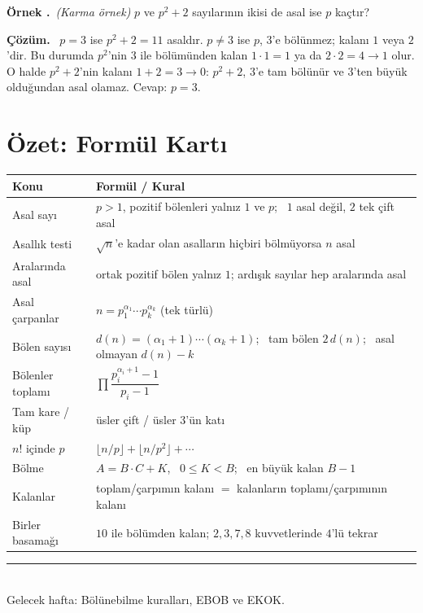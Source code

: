 \documentclass[11pt,a4paper]{article}
\newcounter{ornek}
\newenvironment{ornek}{\refstepcounter{ornek}\par\medskip\noindent\textbf{\color{anamavi}Örnek \theornek.}\ }{\par}
\newenvironment{cozum}{\begin{tcolorbox}[colback=cozumyesil!6,colframe=cozumyesil,boxrule=0.5pt,left=4pt,right=4pt,top=2pt,bottom=2pt,breakable]\textbf{\color{cozumyesil}Çözüm.}\ }{\end{tcolorbox}}
\newcounter{alis}
\begin{document}
\begin{ornek}\textit{(Karma örnek)}
\(p\) ve \(p^2+2\) sayılarının ikisi de asal ise \(p\) kaçtır?
\end{ornek}
\begin{cozum}
\(p=3\) ise \(p^2+2=11\) asaldır. \(p\neq 3\) ise \(p\), \(3\)'e bölünmez; kalanı \(1\) veya \(2\)'dir. Bu durumda \(p^2\)'nin \(3\) ile bölümünden kalan \(1\cdot 1=1\) ya da \(2\cdot 2=4\to 1\) olur. O halde \(p^2+2\)'nin kalanı \(1+2=3\to 0\): \(p^2+2\), \(3\)'e tam bölünür ve \(3\)'ten büyük olduğundan asal olamaz. Cevap: \(p=3\).
\end{cozum}

\section{Özet: Formül Kartı}
\begin{center}
\renewcommand{\arraystretch}{1.6}
\begin{tabular}{@{}ll@{}}
\toprule
Konu & Formül / Kural\\\midrule
Asal sayı & \(p>1\), pozitif bölenleri yalnız \(1\) ve \(p\); \ \(1\) asal değil, \(2\) tek çift asal\\
Asallık testi & \(\sqrt{n}\)'e kadar olan asalların hiçbiri bölmüyorsa \(n\) asal\\
Aralarında asal & ortak pozitif bölen yalnız \(1\); ardışık sayılar hep aralarında asal\\
Asal çarpanlar & \(n=p_1^{\alpha_1}\cdots p_k^{\alpha_k}\) (tek türlü)\\
Bölen sayısı & \(d(n)=(\alpha_1+1)\cdots(\alpha_k+1)\); \ tam bölen \(2\,d(n)\); \ asal olmayan \(d(n)-k\)\\
Bölenler toplamı & \(\prod \dfrac{p_i^{\alpha_i+1}-1}{p_i-1}\)\\
Tam kare / küp & üsler çift / üsler \(3\)'ün katı\\
\(n!\) içinde \(p\) & \(\lfloor n/p\rfloor+\lfloor n/p^2\rfloor+\cdots\)\\
Bölme & \(A=B\cdot C+K\), \ \(0\le K<B\); \ en büyük kalan \(B-1\)\\
Kalanlar & toplam/çarpımın kalanı \(=\) kalanların toplamı/çarpımının kalanı\\
Birler basamağı & \(10\) ile bölümden kalan; \(2,3,7,8\) kuvvetlerinde \(4\)'lü tekrar\\\bottomrule
\end{tabular}
\end{center}

\newpage


\vspace{6pt}
\noindent\textcolor{anamavi}{\rule{\textwidth}{0.5pt}}\\
{\small Gelecek hafta: Bölünebilme kuralları, EBOB ve EKOK.}
\end{document}
